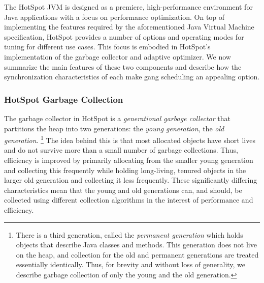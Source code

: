 \documentclass{sig-alternate}
\begin{document}
The HotSpot JVM is designed as a premiere, high-performance environment for Java applications with a focus on performance optimization. On top of implementing the features required by the aforementioned Java Virtual Machine specification, HotSpot provides a number of options and operating modes for tuning for different use cases. This focus is embodied in HotSpot's implementation of the garbage collector and adaptive optimizer. We now summarize the main features of these two components and describe how the synchronization characteristics of each make gang scheduling an appealing option.

\subsubsection{HotSpot Garbage Collection}

The garbage collector in HotSpot is a \textit{generational garbage collector}\cite{hotspot:memory} that partitions the heap into two generations: the \textit{young generation}, the \textit{old generation}. \footnote{There is a third generation, called the \textit{permanent generation} which holds objects that describe Java classes and methods. This generation does not live on the heap, and collection for the old and permanent generations are treated essentially identically. Thus, for brevity and without loss of generality, we describe garbage collection of only the young and the old generation.} The idea behind this is that most allocated objects have short lives and do not survive more than a small number of garbage collections. Thus, efficiency is improved by primarily allocating from the smaller young generation and collecting this frequently while holding long-living, tenured objects in the larger old generation and collecting it less frequently. These significantly differing characteristics mean that the young and old generations can, and should, be collected using different collection algorithms in the interest of performance and efficiency.
\end{document}
